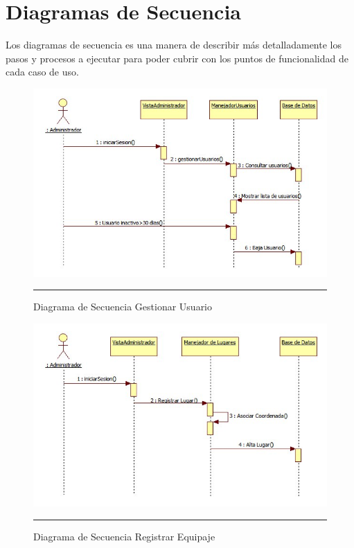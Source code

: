 \section{Diagramas de Secuencia}

Los diagramas de secuencia es una manera de describir más detalladamente los pasos y procesos a ejecutar para poder cubrir con los puntos de funcionalidad de cada caso de uso. 

\begin{figure}[h]
	\centering
		\includegraphics[width=1\textwidth]{Figuras/secGestionarUsuario.png}
		\rule{30em}{1pt}
	\caption[Diagrama de Secuencia Gestionar Usuario]{Diagrama de Secuencia Gestionar Usuario}
	\label{fig:secGestionarUsuario}
\end{figure}

\begin{figure}[H]
	\centering
		\includegraphics[width=1\textwidth]{Figuras/secRegistrarEquipaje.png}
		\rule{30em}{0.5pt}
	\caption[Diagrama de Secuencia Registrar Equipaje]{Diagrama de Secuencia Registrar Equipaje}
	\label{fig:secRegistrarEquipaje}
\end{figure}

